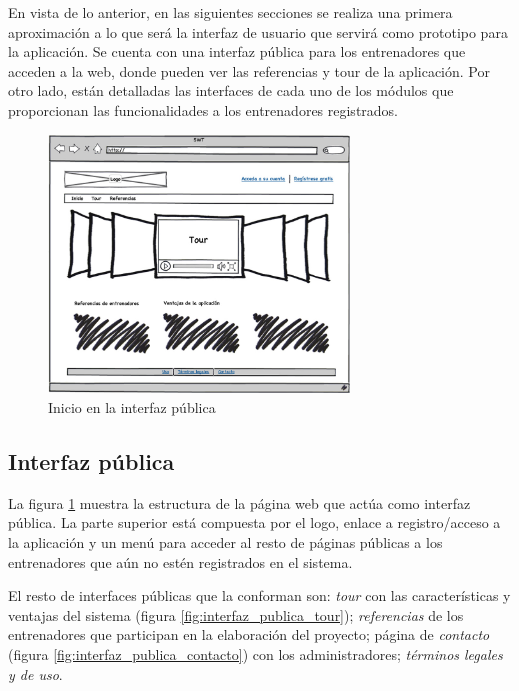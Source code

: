 		En vista de lo anterior, en las siguientes secciones se realiza una primera aproximación a lo que será la interfaz de usuario que servirá como prototipo para la aplicación. Se cuenta con una interfaz pública para los entrenadores que acceden a la web, donde pueden ver las referencias y tour de la aplicación. Por otro lado, están detalladas las interfaces de cada uno de los módulos que proporcionan las funcionalidades a los entrenadores registrados.
	
	\begin{figure}[H]
	  \centering
	    \includegraphics[width=8cm]{./eps/p_interfaz/1_Inicio.eps}
	  \caption{Inicio en la interfaz pública}
	  \label{fig:interfaz_publica_inicio}
	\end{figure}
	
	
	\subsection{Interfaz pública} %
		\label{sub:interfaz_publica}
		
		La figura \ref{fig:interfaz_publica_inicio} muestra la estructura de la página web que actúa como interfaz pública. La parte superior está compuesta por el logo, enlace a registro/acceso a la aplicación y un menú para acceder al resto de páginas públicas a los entrenadores que aún no estén registrados en el sistema.
			
		El resto de interfaces públicas que la conforman son: {\it tour} con las características y ventajas del sistema (figura \ref{fig:interfaz_publica_tour}); {\it referencias} de los entrenadores que participan en la elaboración del proyecto; página de {\it contacto} (figura \ref{fig:interfaz_publica_contacto}) con los administradores; {\it términos legales y de uso}. 
		
